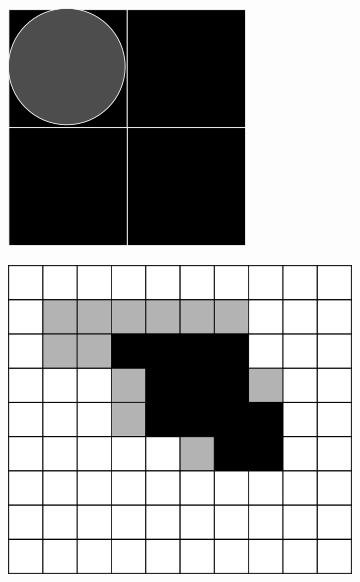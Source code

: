 \documentclass[
  digital,     %
  oneside,     %
  nosansbold,  %
  nocolorbold, %
  lof,         %
  lot,         %
]{fithesis4}
\begin{document}
\begin{figure}
\begin{subfigure}[t]{0.4\textwidth}
        \caption{}
        \label{fig:opening_erosion}
    \end{subfigure}
    \begin{subfigure}[t]{0.2\textwidth}
        \centering
        \includegraphics[width=\textwidth]{resources/inkscape/opening_erosion_se.png}
        \caption{}
        \label{fig:opening_erosion_se}
    \end{subfigure}
    \begin{subfigure}[t]{0.4\textwidth}
        \centering
        \includegraphics[width=\textwidth]{resources/inkscape/opening_dilation.png}

\end{subfigure}
\end{figure}
\end{document}

